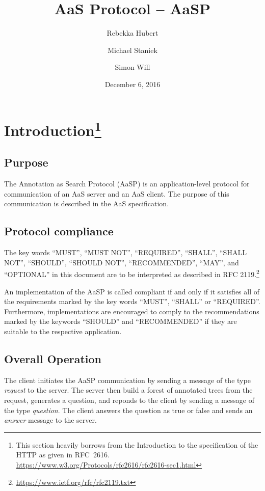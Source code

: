 \documentclass{scrartcl}
\title{AaS Protocol – AaSP}
\author{Rebekka Hubert \and Michael Staniek \and Simon Will}
\date{December 6, 2016}
\newcommand{\messtype}[1]{\emph{#1}}
\newcommand{\checkthis}[1]{#1}
\begin{document}
\maketitle

\section[Introduction]{Introduction\footnote{This section heavily borrows from the Introduction to the specification of the HTTP as given in RFC~2616. \url{https://www.w3.org/Protocols/rfc2616/rfc2616-sec1.html}}}
\label{sec:Introduction}

\subsection{Purpose}
\label{sub:Purpose}

The Annotation as Search Protocol (AaSP) is an application-level protocol for communication of an AaS server and an AaS client.
The purpose of this communication is described in \checkthis{the AaS specification}. %

\subsection{Protocol compliance}
\label{sub:Protocol compliance}

The key words \enquote{MUST}, \enquote{MUST NOT}, \enquote{REQUIRED}, \enquote{SHALL}, \enquote{SHALL NOT}, \enquote{SHOULD}, \enquote{SHOULD NOT}, \enquote{RECOMMENDED},  \enquote{MAY}, and \enquote{OPTIONAL} in this document are to be interpreted as described in RFC 2119.\footnote{\url{https://www.ietf.org/rfc/rfc2119.txt}}

An implementation of the AaSP is called compliant if and only if it satisfies all of the requirements marked by the key words \enquote{MUST}, \enquote{SHALL} or \enquote{REQUIRED}.
Furthermore, implementations are encouraged to comply to the recommendations marked by the keywords \enquote{SHOULD} and \enquote{RECOMMENDED} if they are suitable to the respective application.

\subsection{Overall Operation}
\label{sub:Overall Operation}

The client initiates the AaSP communication by sending a message of the type \messtype{request} to the server.
The server then build a forest of annotated trees from the request, generates a question, and reponds to the client by sending a message of the type \messtype{question}.
The client \checkthis{answers the question as true or false} and sends an \messtype{answer} message to the server.
\end{document}
